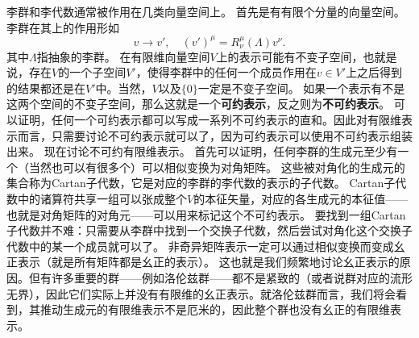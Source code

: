 \documentclass[UTF8, a4paper]{ctexart}
\begin{document}
李群和李代数通常被作用在几类向量空间上。
首先是有有限个分量的向量空间。李群在其上的作用形如
\[
    v \longrightarrow v', \quad (v')^\mu = R_{\nu}^\mu (\Lambda) v^\nu.
\]
其中$\Lambda$指抽象的李群。
在有限维向量空间$V$上的表示可能有不变子空间，也就是说，存在$V$的一个子空间$V'$，使得李群中的任何一个成员作用在$v \in V'$上之后得到的结果都还是在$V'$中。当然，$V$以及$\{0\}$一定是不变子空间。
如果一个表示有不是这两个空间的不变子空间，那么这就是一个\textbf{可约表示}，反之则为\textbf{不可约表示}。
可以证明，任何一个可约表示都可以写成一系列不可约表示的直和。因此对有限维表示而言，只需要讨论不可约表示就可以了，因为可约表示可以使用不可约表示组装出来。
现在讨论不可约有限维表示。
首先可以证明，任何李群的生成元至少有一个（当然也可以有很多个）可以相似变换为对角矩阵。
这些被对角化的生成元的集合称为Cartan子代数，它是对应的李群的李代数的表示的子代数。
Cartan子代数中的诸算符共享一组可以张成整个$V$的本征矢量，对应的各生成元的本征值——也就是对角矩阵的对角元——可以用来标记这个不可约表示。
要找到一组Cartan子代数并不难：只需要从李群中找到一个交换子代数，然后尝试对角化这个交换子代数中的某一个成员就可以了。
非奇异矩阵表示一定可以通过相似变换而变成幺正表示（就是所有矩阵都是幺正的表示）。
这也就是我们频繁地讨论幺正表示的原因。但有许多重要的群——例如洛伦兹群——都不是紧致的（或者说群对应的流形无界），因此它们实际上并没有有限维的幺正表示。就洛伦兹群而言，我们将会看到，其推动生成元的有限维表示不是厄米的，因此整个群也没有幺正的有限维表示。
\end{document}
